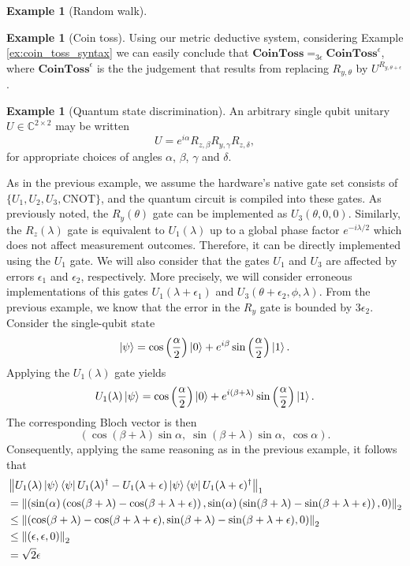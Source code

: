 \documentclass[10pt,a4paper]{amsart}
\theoremstyle{definition}
\theoremstyle{definition}
\newtheorem{example}[definition]{Example}
\theoremstyle{definition}
\theoremstyle{definition}
\theoremstyle{definition}
\theoremstyle{definition}
\begin{document}
\begin{example}[Random walk]
\begin{example}[Coin toss]
Using our metric deductive system, considering Example \ref{ex:coin_toss_syntax} we can easily conclude that $\textbf{CoinToss} =_{3 \epsilon} \textbf{CoinToss}^{\epsilon}$, where $\textbf{CoinToss}^{\epsilon}$ is the the judgement that results from replacing $R_{y, \theta}$ by $U^{R_{y, \theta + \epsilon}}$.

\end {example}

\begin{example}[Quantum state discrimination]
  An arbitrary single qubit unitary $U \in \mathbb{C}^{2 \times 2}$ may be written
\[
U = e^{i\alpha} R_{z,\beta} R_{y,\gamma} R_{z,\delta},
\]
for appropriate choices of angles $\alpha$, $\beta$, $\gamma$ and $\delta$.


As in the previous example, we assume the hardware's native gate set consists of $\{U_1, U_2, U_3, \text{CNOT}\}$, and the quantum circuit is compiled into these gates.  
As previously noted, the $R_y(\theta)$ gate can be implemented as $U_3(\theta, 0, 0)$.  
Similarly, the $R_z(\lambda)$ gate is equivalent to $U_1(\lambda)$ up to a global phase factor $e^{-i\lambda/2}$ which does not affect measurement outcomes. 
Therefore, it can be directly implemented using the $U_1$ gate.  
We will also consider that the gates $U_1$ and $U_3$ are affected by errors $\epsilon_1$ and $\epsilon_2$, respectively. 
More precisely, we will consider erroneous implementations of this gates $U_1(\lambda + \epsilon_1)$ and $U_3(\theta + \epsilon_2, \phi, \lambda)$. 
From the previous example, we know that the error in the $R_y$ gate is bounded by $3 \epsilon_2$. 
Consider the single-qubit state
\[
\ket{\psi} = \cos\left(\frac{\alpha}{2}\right)\ket{0} + e^{i\beta}\sin\left(\frac{\alpha}{2}\right)\ket{1}.
\]
Applying the \( U_1(\lambda) \) gate yields
\[
U_1(\lambda)\ket{\psi} = \cos\left(\frac{\alpha}{2}\right)\ket{0} + e^{i(\beta + \lambda)}\sin\left(\frac{\alpha}{2}\right)\ket{1}.
\]
The corresponding Bloch vector is then
\[
\left(\!\cos(\beta + \lambda)\sin\alpha,\; \sin(\beta + \lambda)\sin\alpha,\; \cos\alpha\right).
\]
Consequently, applying the same reasoning as in the previous example, it follows that
\begin{align*}
  & \left\lVert U_1(\lambda) \ket{\psi}\bra{\psi} U_1(\lambda)^\dag - U_1(\lambda + \epsilon) \ket{\psi}\bra{\psi}U_1(\lambda + \epsilon)^\dag  \right\rVert_{1} \\
  & = \left\lVert \left(\sin(\alpha) \left( \cos(\beta + \lambda) -  \cos(\beta + \lambda + \epsilon) \right),\sin(\alpha) \left( \sin(\beta + \lambda) -  \sin(\beta + \lambda + \epsilon) \right),0 \right) \right\rVert_{2} \\
  & \leq \left\lVert \left( \cos(\beta + \lambda) -  \cos(\beta + \lambda + \epsilon) , \sin(\beta + \lambda) -  \sin(\beta + \lambda + \epsilon) ,0 \right) \right\rVert_{2} \\
  & \leq \left\lVert \left( \epsilon, \epsilon ,0 \right) \right\rVert_{2} \\
  & = \sqrt{2}\epsilon \\
\end{align*} 


\end{example}
\end{example}
\end{document}
